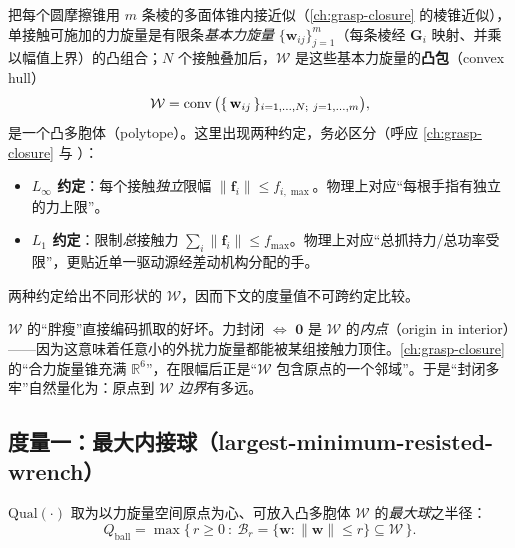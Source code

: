 把每个圆摩擦锥用 $m$ 条棱的多面体锥内接近似（\cref{ch:grasp-closure} 的棱锥近似），单接触可施加的力旋量是有限条\emph{基本力旋量} $\{\mathbf{w}_{ij}\}_{j=1}^m$（每条棱经 $\mathbf{G}_i$ 映射、并乘以幅值上界）的凸组合；$N$ 个接触叠加后，$\mathcal{W}$ 是这些基本力旋量的\textbf{凸包}（convex hull）
\begin{equation}
  \mathcal{W}=\conv\big(\{\,\mathbf{w}_{ij}\,\}_{i=1,\dots,N;\ j=1,\dots,m}\big),
  \label{eq:gp-gws-hull}
\end{equation}
是一个凸多胞体（polytope）。这里出现两种约定，务必区分（呼应 \cref{ch:grasp-closure} 与 \cite{ferrari1992}）：
\begin{itemize}
  \item \textbf{$L_\infty$ 约定}：每个接触\emph{独立}限幅 $\|\mathbf{f}_i\|\le f_{i,\max}$。物理上对应“每根手指有独立的力上限”。
  \item \textbf{$L_1$ 约定}：限制\emph{总}接触力 $\sum_i\|\mathbf{f}_i\|\le f_{\max}$。物理上对应“总抓持力/总功率受限”，更贴近单一驱动源经差动机构分配的手。
\end{itemize}
两种约定给出不同形状的 $\mathcal{W}$，因而下文的度量值不可跨约定比较。

\begin{insight}
$\mathcal{W}$ 的“胖瘦”直接编码抓取的好坏。力封闭 $\iff$ $\mathbf{0}$ 是 $\mathcal{W}$ 的\emph{内点}（origin in interior）——因为这意味着任意小的外扰力旋量都能被某组接触力顶住。\cref{ch:grasp-closure} 的“合力旋量锥充满 $\mathbb{R}^6$”，在限幅后正是“$\mathcal{W}$ 包含原点的一个邻域”。于是“封闭多牢”自然量化为：原点到 $\mathcal{W}$ \emph{边界}有多远。
\end{insight}

\subsection{度量一：最大内接球（largest-minimum-resisted-wrench）}
\begin{definition}[最大内接球半径度量]\label{def:gp-ball}
$\mathrm{Qual}(\cdot)$ 取为以力旋量空间原点为心、可放入凸多胞体 $\mathcal{W}$ 的\emph{最大球}之半径：
\begin{equation}
  Q_{\text{ball}}=\max\{\,r\ge 0\ :\ \mathcal{B}_r=\{\mathbf{w}:\|\mathbf{w}\|\le r\}\subseteq\mathcal{W}\,\}.
  \label{eq:gp-ball}
\end{equation}
\end{definition}


